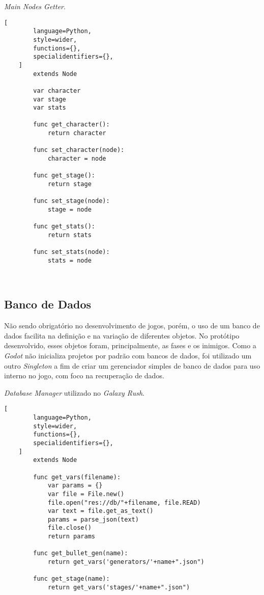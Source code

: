 \begin{programruledcaption}{\textit{Main Nodes Getter}.\label{prog:main_nodes_getter}}
    \begin{lstlisting}[
        language=Python,
        style=wider,
        functions={},
        specialidentifiers={},
    ]
        extends Node

        var character
        var stage
        var stats
        
        func get_character():
            return character
        
        func set_character(node):
            character = node
        
        func get_stage():
            return stage
        
        func set_stage(node):
            stage = node
        
        func get_stats():
            return stats
        
        func set_stats(node):
            stats = node
        
    
    \end{lstlisting}
\end{programruledcaption}

\subsection{Banco de Dados}\label{BancoDeDados}

Não sendo obrigatório no desenvolvimento de jogos, porém, o uso de um banco de dados facilita na definição e na variação de diferentes objetos. No protótipo desenvolvido, esses objetos foram, principalmente, as fases e os inimigos. Como a \textit{Godot} não inicializa projetos por padrão com bancos de dados, foi utilizado um outro \textit{Singleton} a fim de criar um gerenciador simples de banco de dados para uso interno no jogo, com foco na recuperação de dados.

\pagebreak

\begin{programruledcaption}{\textit{Database Manager} utilizado no \textit{Galaxy Rush}.\label{prog:db_manager}}
    \begin{lstlisting}[
        language=Python,
        style=wider,
        functions={},
        specialidentifiers={},
    ]
        extends Node

        func get_vars(filename):
            var params = {}
            var file = File.new()
            file.open("res://db/"+filename, file.READ)
            var text = file.get_as_text()
            params = parse_json(text)
            file.close()
            return params
        
        func get_bullet_gen(name):
            return get_vars('generators/'+name+".json")
        
        func get_stage(name):
            return get_vars('stages/'+name+".json")
        
    
    \end{lstlisting}
\end{programruledcaption}

